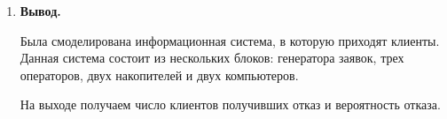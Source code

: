 \documentclass[a4paper,14pt]{extreport} %
\begin{document}
\begin{enumerate}
\item \textbf{Вывод. }

Была смоделирована информационная система, в которую приходят клиенты. Данная система состоит из нескольких блоков: генератора заявок, трех операторов, двух накопителей и двух компьютеров. 

На выходе получаем число клиентов получивших отказ и вероятность отказа. 

\end{enumerate}
\end{document}
